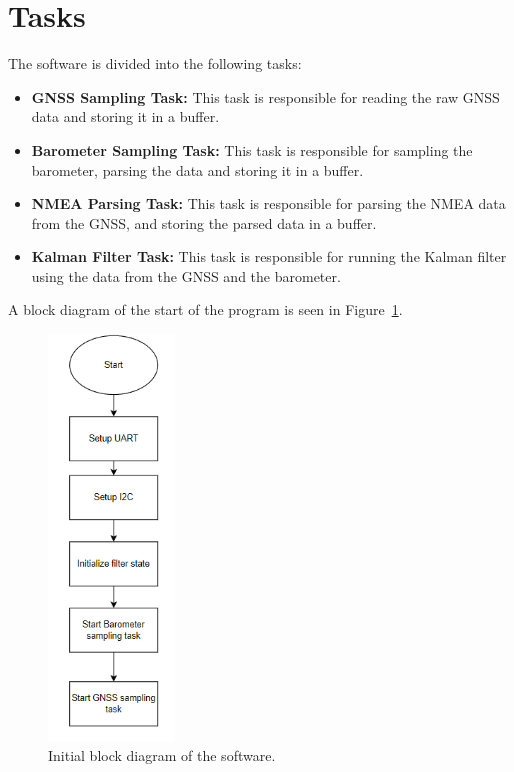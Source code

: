 \section{Tasks}
The software is divided into the following tasks:
\begin{itemize}
    \item \textbf{GNSS Sampling Task:} This task is responsible for reading the raw GNSS data and storing it in a buffer.
    \item \textbf{Barometer Sampling Task:} This task is responsible for sampling the barometer, parsing the data and storing it in a buffer.
    \item \textbf{NMEA Parsing Task:} This task is responsible for parsing the NMEA data from the GNSS, and storing the parsed data in a buffer.
    \item \textbf{Kalman Filter Task:} This task is responsible for running the Kalman filter using the data from the GNSS and the barometer.
\end{itemize}
A block diagram of the start of the program is seen in Figure~\ref{fig:initial-block-diagram}.
\begin{figure}[H]
    \centering
    \includegraphics[width=0.3\textwidth]{chapters/04Software/figures/bob}
    \caption{Initial block diagram of the software.}
    \label{fig:initial-block-diagram}
\end{figure}

